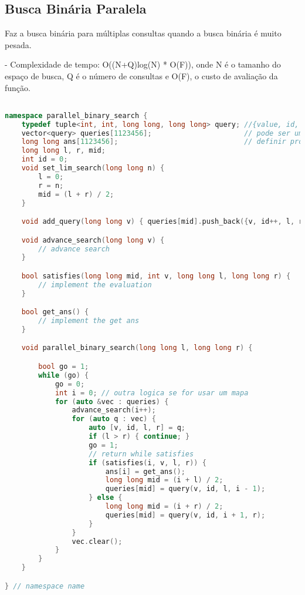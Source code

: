 \documentclass[11pt, a4paper, twoside]{article}
\begin{document}
\subsection{Busca Binária Paralela}


Faz a busca binária para múltiplas consultas quando a busca binária é muito pesada.


- Complexidade de tempo: O((N+Q)log(N) * O(F)), onde N é o tamanho do espaço de busca, Q é o número de consultas e O(F), o custo de avaliação da função.

\begin{lstlisting}[language=C++]

namespace parallel_binary_search {
    typedef tuple<int, int, long long, long long> query; //{value, id, l, r}
    vector<query> queries[1123456];                      // pode ser um mapa se for muito esparso
    long long ans[1123456];                              // definir pro tamanho das queries
    long long l, r, mid;
    int id = 0;
    void set_lim_search(long long n) {
        l = 0;
        r = n;
        mid = (l + r) / 2;
    }

    void add_query(long long v) { queries[mid].push_back({v, id++, l, r}); }

    void advance_search(long long v) {
        // advance search
    }

    bool satisfies(long long mid, int v, long long l, long long r) {
        // implement the evaluation
    }

    bool get_ans() {
        // implement the get ans
    }

    void parallel_binary_search(long long l, long long r) {

        bool go = 1;
        while (go) {
            go = 0;
            int i = 0; // outra logica se for usar um mapa
            for (auto &vec : queries) {
                advance_search(i++);
                for (auto q : vec) {
                    auto [v, id, l, r] = q;
                    if (l > r) { continue; }
                    go = 1;
                    // return while satisfies
                    if (satisfies(i, v, l, r)) {
                        ans[i] = get_ans();
                        long long mid = (i + l) / 2;
                        queries[mid] = query(v, id, l, i - 1);
                    } else {
                        long long mid = (i + r) / 2;
                        queries[mid] = query(v, id, i + 1, r);
                    }
                }
                vec.clear();
            }
        }
    }

} // namespace name
\end{lstlisting}
\end{document}

